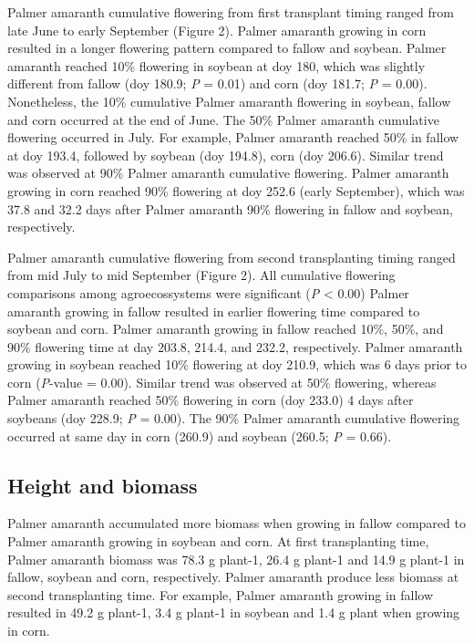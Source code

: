 \documentclass[utf8]{frontiersSCNS}
\begin{document}
Palmer amaranth cumulative flowering from first transplant timing ranged
from late June to early September (Figure 2). Palmer amaranth growing in
corn resulted in a longer flowering pattern compared to fallow and
soybean. Palmer amaranth reached 10\% flowering in soybean at doy 180,
which was slightly different from fallow (doy 180.9; \emph{P} = 0.01)
and corn (doy 181.7; \emph{P} = 0.00). Nonetheless, the 10\% cumulative
Palmer amaranth flowering in soybean, fallow and corn occurred at the
end of June. The 50\% Palmer amaranth cumulative flowering occurred in
July. For example, Palmer amaranth reached 50\% in fallow at doy 193.4,
followed by soybean (doy 194.8), corn (doy 206.6). Similar trend was
observed at 90\% Palmer amaranth cumulative flowering. Palmer amaranth
growing in corn reached 90\% flowering at doy 252.6 (early September),
which was 37.8 and 32.2 days after Palmer amaranth 90\% flowering in
fallow and soybean, respectively.

Palmer amaranth cumulative flowering from second transplanting timing
ranged from mid July to mid September (Figure 2). All cumulative
flowering comparisons among agroecossystems were significant (\emph{P}
\textless{} 0.00) Palmer amaranth growing in fallow resulted in earlier
flowering time compared to soybean and corn. Palmer amaranth growing in
fallow reached 10\%, 50\%, and 90\% flowering time at day 203.8, 214.4,
and 232.2, respectively. Palmer amaranth growing in soybean reached 10\%
flowering at doy 210.9, which was 6 days prior to corn (\emph{P}-value =
0.00). Similar trend was observed at 50\% flowering, whereas Palmer
amaranth reached 50\% flowering in corn (doy 233.0) 4 days after
soybeans (doy 228.9; \emph{P} = 0.00). The 90\% Palmer amaranth
cumulative flowering occurred at same day in corn (260.9) and soybean
(260.5; \emph{P} = 0.66).

\hypertarget{height-and-biomass}{%
\subsection*{Height and biomass}\label{height-and-biomass}}

Palmer amaranth accumulated more biomass when growing in fallow compared
to Palmer amaranth growing in soybean and corn. At first transplanting
time, Palmer amaranth biomass was 78.3 g plant-1, 26.4 g plant-1 and
14.9 g plant-1 in fallow, soybean and corn, respectively. Palmer
amaranth produce less biomass at second transplanting time. For example,
Palmer amaranth growing in fallow resulted in 49.2 g plant-1, 3.4 g
plant-1 in soybean and 1.4 g plant when growing in corn.
\end{document}
